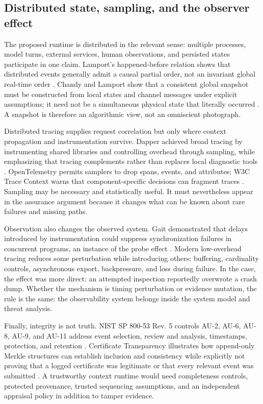 \documentclass[10pt,a4paper]{article}
\begin{document}
\subsection{Distributed state, sampling, and the observer effect}

The proposed runtime is distributed in the relevant sense: multiple processes, model turns, external services, human observations, and persisted states participate in one claim. Lamport's happened-before relation shows that distributed events generally admit a causal partial order, not an invariant global real-time order \cite{lamport1978}. Chandy and Lamport show that a consistent global snapshot must be constructed from local states and channel messages under explicit assumptions; it need not be a simultaneous physical state that literally occurred \cite{chandy1985}. A snapshot is therefore an algorithmic view, not an omniscient photograph.

Distributed tracing supplies request correlation but only where context propagation and instrumentation survive. Dapper achieved broad tracing by instrumenting shared libraries and controlling overhead through sampling, while emphasizing that tracing complements rather than replaces local diagnostic tools \cite{dapper2010}. OpenTelemetry permits samplers to drop spans, events, and attributes; W3C Trace Context warns that component-specific decisions can fragment traces \cite{otel,w3ctrace}. Sampling may be necessary and statistically useful. It must nevertheless appear in the assurance argument because it changes what can be known about rare failures and missing paths.

Observation also changes the observed system. Gait demonstrated that delays introduced by instrumentation could suppress synchronization failures in concurrent programs, an instance of the probe effect \cite{gait1986}. Modern low-overhead tracing reduces some perturbation while introducing others: buffering, cardinality controls, asynchronous export, backpressure, and loss during failure. In the case, the effect was more direct: an attempted inspection reportedly overwrote a crash dump. Whether the mechanism is timing perturbation or evidence mutation, the rule is the same: the observability system belongs inside the system model and threat analysis.

Finally, integrity is not truth. NIST SP 800-53 Rev. 5 controls AU-2, AU-6, AU-8, AU-9, and AU-11 address event selection, review and analysis, timestamps, protection, and retention \cite{nist80053}. Certificate Transparency illustrates how append-only Merkle structures can establish inclusion and consistency while explicitly not proving that a logged certificate was legitimate or that every relevant event was submitted \cite{rfc9162}. A trustworthy context runtime would need completeness controls, protected provenance, trusted sequencing assumptions, and an independent appraisal policy in addition to tamper evidence.
\end{document}
